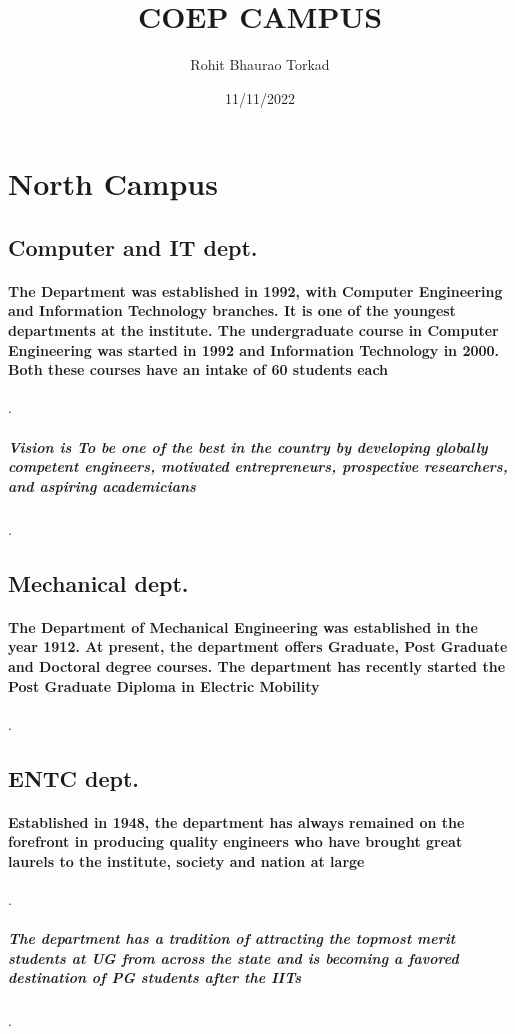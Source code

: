\documentclass{article}
\title{\textbf{COEP CAMPUS}}
\author{Rohit Bhaurao Torkad}
\date{11/11/2022}
\begin{document}
\maketitle
{}
\newpage
{}
\tableofcontents
\newpage
{}
\section{North Campus}

	\subsection{Computer and IT dept.}
	\paragraph{The Department was established in 1992, with Computer Engineering and Information Technology branches. It is one of the youngest departments at the institute. The undergraduate course in Computer Engineering was started in 1992 and Information Technology in 2000. Both these courses have an intake of 60 students each} 
.
\subparagraph{Vision is To be one of the best in the country by developing globally competent engineers, motivated entrepreneurs, prospective researchers, and aspiring academicians}.
\newpage

	\subsection{Mechanical dept.}
	\paragraph{ The Department of Mechanical Engineering was established in the year 1912. At present, the department offers Graduate, Post Graduate and Doctoral degree courses. The department has recently started the Post Graduate Diploma in Electric Mobility}.
\newpage
	\subsection{ENTC dept.}
	\paragraph{ Established in 1948, the department has always remained on the forefront in producing quality engineers who have brought great laurels to the institute, society and nation at large}.
	\subparagraph{The department has a tradition of attracting the topmost merit students at UG from across the state and is becoming a favored destination of PG students after the IITs}.	
	\newpage
\end{document}
